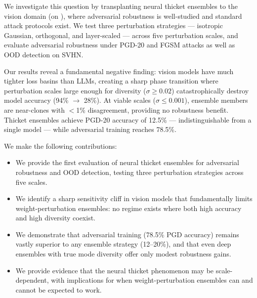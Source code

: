 We investigate this question by transplanting neural thicket ensembles to the vision domain (\resnet on \cifarten), where adversarial robustness is well-studied and standard attack protocols exist. We test three perturbation strategies --- isotropic Gaussian, orthogonal, and layer-scaled --- across five perturbation scales, and evaluate adversarial robustness under PGD-20 and FGSM attacks as well as OOD detection on SVHN.

Our results reveal a fundamental negative finding: vision models have much tighter loss basins than LLMs, creating a sharp phase transition where perturbation scales large enough for diversity ($\sigma \geq 0.02$) catastrophically destroy model accuracy (94\% $\to$ 28\%). At viable scales ($\sigma \leq 0.001$), ensemble members are near-clones with $<$1\% disagreement, providing no robustness benefit. Thicket ensembles achieve PGD-20 accuracy of 12.5\% --- indistinguishable from a single model --- while adversarial training reaches 78.5\%.

We make the following contributions:
\begin{itemize}[leftmargin=*,itemsep=0pt,topsep=0pt]
    \item We provide the first evaluation of neural thicket ensembles for adversarial robustness and OOD detection, testing three perturbation strategies across five scales.
    \item We identify a sharp sensitivity cliff in vision models that fundamentally limits weight-perturbation ensembles: no regime exists where both high accuracy and high diversity coexist.
    \item We demonstrate that adversarial training (78.5\% PGD accuracy) remains vastly superior to any ensemble strategy (12--20\%), and that even deep ensembles with true mode diversity offer only modest robustness gains.
    \item We provide evidence that the neural thicket phenomenon may be scale-dependent, with implications for when weight-perturbation ensembles can and cannot be expected to work.
\end{itemize}
